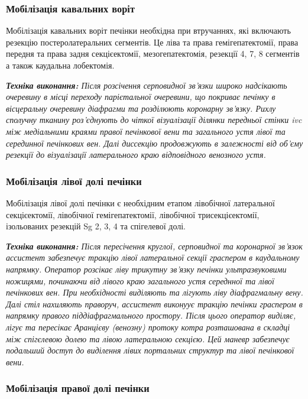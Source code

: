 \begin{refsection}
\subsubsection{Мобілізація кавальних воріт}

Мобілізація кавальних воріт печінки необхідна при втручаннях, які включають резекцію постеролатеральних сегментів. Це ліва та права гемігепатектомії, права передня та права задня секцієектомії, мезогепатектомія, резекції 4, 7, 8 сегментів а також каудальна лобектомія.

\textit{ \textbf{Техніка виконання:} Після розсічення серповидної зв'язки широко надсікають очеревину в місці переходу парієтальної очеревини, що покриває печінку в вісцеральну очеревину діафрагми та розділюють коронарну зв'язку. Рихлу сполучну тканину роз'єднують до чіткої візуалізації ділянки передньої стінки \acrshort{ivc} між медіальними краями правої печінкової вени та загального устя лівої та серединної печінкових вен. Далі диссекцію продовжують в залежності від об'єму резекції до візуалізації латерального краю відповідного венозного устя.}

\subsubsection{Мобілізація лівої долі печінки} 

Мобілізація лівої долі печінки є необхідним етапом лівобічної латеральної секцієектомії, лівобічної гемігепатектомії, лівобічної трисекцієектомії, ізольованих резекцій Sg 2, 3, 4  та спігелевої долі.

\textit{ \textbf{Техніка виконання:} Після пересічення круглої, серповидної та коронарної зв'язок ассистент забезпечує тракцію лівої латеральної секції граспером в каудальному напрямку. Оператор розсікає ліву трикутну зв'язку печінки ультразвуковими ножицями, починаючи від лівого краю загального устя середнної та лівої печінкових вен. При необхідності виділяють та лігують ліву діафрагмальну вену. Далі стіл нахиляють праворуч, ассистент виконуує тракцію печінки граспером в напрямку правого піддіафрагмального простору. Після цього оператор виділяє, лігує та пересікає Аранцієву (венозну) протоку котра розташована в складці між спігєлевою долею та лівою латеральною секцією. Цей маневр забезпечує подальший доступ до виділення лівих портальних структур та лівої печінкової вени.
}

\subsubsection{Мобілізація правої долі печінки}


\end{refsection}
